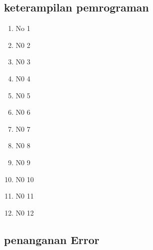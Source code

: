 \subsection{keterampilan pemrograman}
\begin{enumerate}

\item No 1


\item N0 2


\item N0 3


\item N0 4


\item N0 5


\item N0 6


\item N0 7


\item N0 8


\item N0 9


\item N0 10


\item N0 11


\item N0 12

\end{enumerate}

\subsection{penanganan Error}


